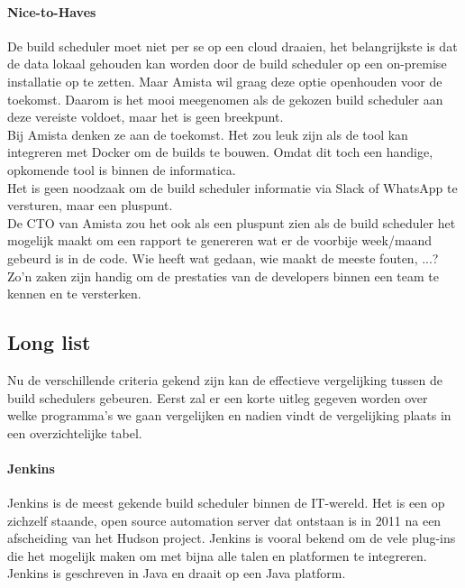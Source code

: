             \paragraph{Nice-to-Haves}
            De build scheduler moet niet per se op een cloud draaien, het belangrijkste is dat de data lokaal gehouden kan worden door de build scheduler op een on-premise installatie op te zetten. Maar Amista wil graag deze optie openhouden voor de toekomst. Daarom is het mooi meegenomen als de gekozen build scheduler aan deze vereiste voldoet, maar het is geen breekpunt.\\
            Bij Amista denken ze aan de toekomst. Het zou leuk zijn als de tool kan integreren met Docker om de builds te bouwen. Omdat dit toch een handige, opkomende tool is binnen de informatica.\\
            Het is geen noodzaak om de build scheduler informatie via Slack of WhatsApp te versturen, maar een pluspunt.\\
            De CTO van Amista zou het ook als een pluspunt zien als de build scheduler het mogelijk maakt om een rapport te genereren wat er de voorbije week/maand gebeurd is in de code. Wie heeft wat gedaan, wie maakt de meeste fouten, ...? Zo'n zaken zijn handig om de prestaties van de developers binnen een team te kennen en te versterken.

        \subsection{Long list}
        Nu de verschillende criteria gekend zijn kan de effectieve vergelijking tussen de build schedulers gebeuren.
        Eerst zal er een korte uitleg gegeven worden over welke programma's we gaan vergelijken en nadien vindt de vergelijking plaats in een overzichtelijke tabel.

            
            \paragraph{Jenkins}
            Jenkins is de meest gekende build scheduler binnen de IT-wereld. Het is een op zichzelf staande, open source automation server dat ontstaan is in 2011 na een afscheiding van het Hudson project. Jenkins is vooral bekend om de vele plug-ins die het mogelijk maken om met bijna alle talen en platformen te integreren. Jenkins is geschreven in Java en draait op een Java platform.
            
